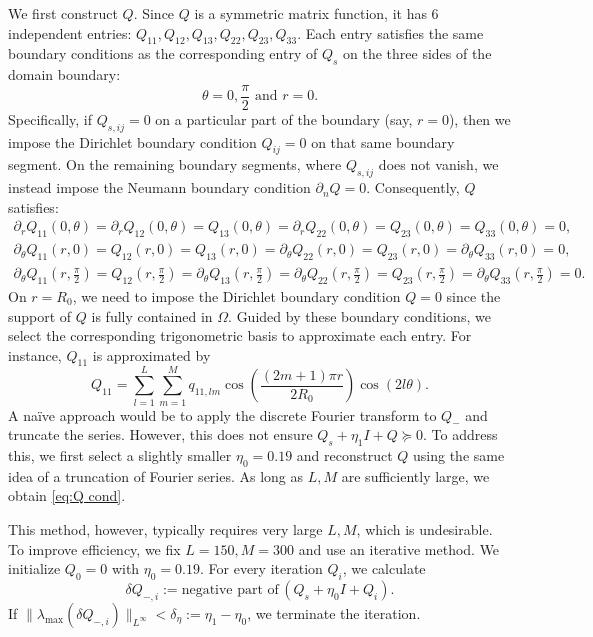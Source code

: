 \documentclass[11pt,a4paper]{article}
\numberwithin{equation}{section}
\newcommand{\assign}{:=}
\newcommand{\infixand}{\text{ and }}
\begin{document}
We first construct $Q$. Since $Q$ is a symmetric matrix function, it has 6
independent entries: $Q_{11}, Q_{12}, Q_{13}, Q_{22}, Q_{23}, Q_{33}$. Each
entry satisfies the same boundary conditions as the corresponding entry of
$Q_s$ on the three sides of the domain boundary:
\[ \theta = 0, \frac{\pi}{2} \infixand r = 0. \]
Specifically, if $Q_{s, i j} = 0$ on a particular part of the boundary (say,
$r = 0$), then we impose the Dirichlet boundary condition $Q_{i j} = 0$ on
that same boundary segment. On the remaining boundary segments, where $Q_{s, i
j}$ does not vanish, we instead impose the Neumann boundary condition
$\partial_n Q = 0$. Consequently, $Q$ satisfies:
\[ \begin{array}{l}
     \partial_r Q_{11} (0, \theta) = \partial_r Q_{12} (0, \theta) = Q_{13}
     (0, \theta) = \partial_r Q_{22} (0, \theta) = Q_{23} (0, \theta) = Q_{33}
     (0, \theta) = 0,\\
     \partial_{\theta} Q_{11} (r, 0) = Q_{12} (r, 0) = Q_{13} (r, 0) =
     \partial_{\theta} Q_{22} (r, 0) = Q_{23} (r, 0) = \partial_{\theta}
     Q_{33} (r, 0) = 0,\\
     \partial_{\theta} Q_{11} \left( r, \frac{\pi}{2} \right) = Q_{12} \left(
     r, \frac{\pi}{2} \right) = \partial_{\theta} Q_{13} \left( r,
     \frac{\pi}{2} \right) = \partial_{\theta} Q_{22} \left( r, \frac{\pi}{2}
     \right) = Q_{23} \left( r, \frac{\pi}{2} \right) = \partial_{\theta}
     Q_{33} \left( r, \frac{\pi}{2} \right) = 0.
   \end{array} \]
On $r = R_0$, we need to impose the Dirichlet boundary condition $Q = 0$ since
the support of $Q$ is fully contained in $\Omega$. Guided by these boundary
conditions, we select the corresponding trigonometric basis to approximate
each entry. For instance, $Q_{11}$ is approximated by
\[ Q_{11} = \sum_{l = 1}^L \sum_{m = 1}^M q_{11, l m} \cos \left( \frac{(2 m +
   1) \pi r}{2 R_0} \right) \cos (2 l \theta) . \]
A na{\"i}ve approach would be to apply the discrete Fourier transform to $Q_{-}$
and truncate the series. However, this does not ensure $Q_s + \eta_1 I + Q
\succeq 0$. To address this, we first select a slightly smaller $\eta_0 =
0.19$ and  reconstruct $Q$ using the
same idea of a truncation of Fourier series. As long as $L, M$ are sufficiently large, we obtain \eqref{eq:Q
cond}.

This method, however, typically requires very large $L, M$, which is
undesirable. To improve efficiency, we fix $L = 150, M = 300$ and use an iterative method. We initialize
$Q_0 = 0$ with $\eta_0 = 0.19$. For every iteration $Q_i$, we calculate
\[ \delta Q_{-, i} \assign \text{negative part of}  \,(Q_s + \eta_0 I + Q_i) .
\]
If $\| \lambda_{\max} (\delta Q_{-, i}) \|_{L^{\infty}} < \delta_{\eta}
\assign \eta_1 - \eta_0$, we terminate the iteration.
\end{document}

